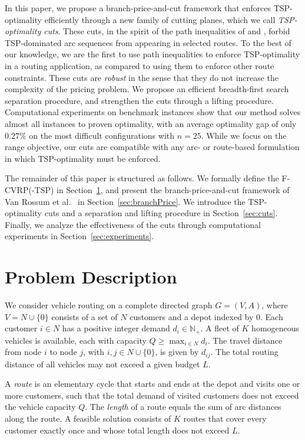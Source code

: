 \documentclass[a4paper,fleqn]{cas-dc}%
\newcommand{\CitetVR}[1]{Van Rossum et al.\ \cite{#1}}
\begin{document}
In this paper, we propose a branch-price-and-cut framework that enforces TSP-optimality efficiently through a new family of cutting planes, which we call \emph{TSP-optimality cuts}. These cuts, in the spirit of the path inequalities of \citet{ascheuer2000polyhedral} and \citet{kallehauge2007path}, forbid TSP-dominated arc sequences from appearing in selected routes. To the best of our knowledge, we are the first to use path inequalities to enforce TSP-optimality in a routing application, as compared to using them to enforce other route constraints. These cuts are \emph{robust} in the sense that they do not increase the complexity of the pricing problem. We propose an efficient breadth-first search separation procedure, and strengthen the cuts through a lifting procedure. Computational experiments on benchmark instances show that our method solves almost all instances to proven optimality, with an average optimality gap of only $0.27\%$ on the most difficult configurations with $n=25$. While we focus on the range objective, our cuts are compatible with any arc- or route-based formulation in which TSP-optimality must be enforced.

The remainder of this paper is structured as follows. We formally define the F-CVRP(-TSP) in Section~\ref{sec:problem}, and present the branch-price-and-cut framework of \CitetVR{rossum2025efficient} in Section~\ref{sec:branchPrice}. We introduce the TSP-optimality cuts and a separation and lifting procedure in Section~\ref{sec:cuts}. Finally, we analyze the effectiveness of the cuts through computational experiments in Section~\ref{sec:experiments}.

\section{Problem Description}
\label{sec:problem}

We consider vehicle routing on a complete directed graph $G = (V, A)$, where $V = N \cup \{0\}$ consists of a set of $N$ customers and a depot indexed by $0$. Each customer $i \in N$ has a positive integer demand $d_i \in \mathbb{N}_+$. A fleet of $K$ homogeneous vehicles is available, each with capacity $Q \geq\max_{i\in N}d_i$. The travel distance from node $i$ to node $j$, with $i, j \in N \cup \{0\}$, is given by $d_{ij}$. The total routing distance of all vehicles may not exceed a given budget $L$.

A \emph{route} is an elementary cycle that starts and ends at the depot and visits one or more customers, such that the total demand of visited customers does not exceed the vehicle capacity $Q$. The \emph{length} of a route equals the sum of arc distances along the route. A feasible solution consists of $K$ routes that cover every customer exactly once and whose total length does not exceed $L$.
\end{document}
